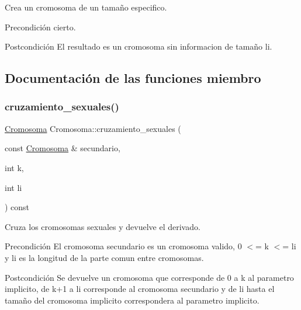 Crea un cromosoma de un tamaño especifico. 

\begin{DoxyPrecond}{Precondición}
cierto. 
\end{DoxyPrecond}
\begin{DoxyPostcond}{Postcondición}
El resultado es un cromosoma sin informacion de tamaño li. 
\end{DoxyPostcond}


\subsection{Documentación de las funciones miembro}
\mbox{\label{class_cromosoma_a009c3b88b85d471334ba297593f6f907}} 
\subsubsection{\texorpdfstring{cruzamiento\+\_\+sexuales()}{cruzamiento\_sexuales()}}
{\footnotesize\ttfamily \hyperlink{class_cromosoma}{Cromosoma} Cromosoma\+::cruzamiento\+\_\+sexuales (\begin{DoxyParamCaption}\item[{const \hyperlink{class_cromosoma}{Cromosoma} \&}]{secundario,  }\item[{int}]{k,  }\item[{int}]{li }\end{DoxyParamCaption}) const}



Cruza los cromosomas sexuales y devuelve el derivado. 

\begin{DoxyPrecond}{Precondición}
El cromosoma secundario es un cromosoma valido, 0 $<$= k $<$= li y li es la longitud de la parte comun entre cromosomas. 
\end{DoxyPrecond}
\begin{DoxyPostcond}{Postcondición}
Se devuelve un cromosoma que corresponde de 0 a k al parametro implicito, de k+1 a li corresponde al cromosoma secundario y de li hasta el tamaño del cromosoma implicito correspondera al parametro implicito. 
\end{DoxyPostcond}
\mbox{\label{class_cromosoma_a1ef5ef2cfc36fe9d414d3f5be0f6a2af}} 
